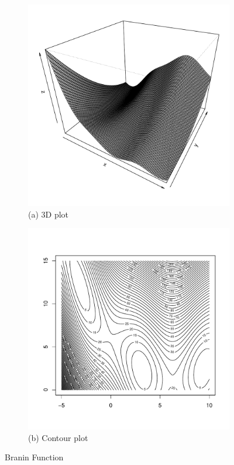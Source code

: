 \documentclass [PhD] {package/uclathes}
\begin{document}
\begin{figure}%
\centering
\begin{subfigure}[b]{0.4\textwidth}
\centering
\includegraphics[width=\textwidth]{chapters/EGO/pdfs/branin_fun}
\caption*{(a) 3D plot}
\end{subfigure}
\hfill
\begin{subfigure}[b]{0.4\textwidth}
\centering
\includegraphics[width=\textwidth]{chapters/EGO/pdfs/branin_contour}
  \caption*{(b) Contour plot}
\end{subfigure}
\caption{Branin Function}
    \label{fig:branin}
\end{figure}
\end{document}
